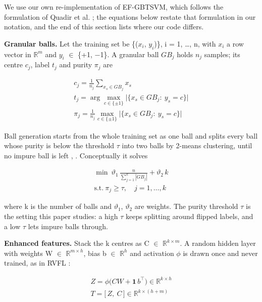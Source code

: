 \documentclass[conference,a4paper]{IEEEtran}
\begin{document}
We use our own re-implementation of EF-GBTSVM, which follows the formulation of Quadir et al. \cite{r29}; the equations below restate that formulation in our notation, and the end of this section lists where our code differs.

\textbf{Granular balls.} Let the training set be \{($x_i$, $y_i$)\}, i = 1, \ldots{}, n, with $x_i$ a row vector in $\mathbb{R}^{m}$ and $y_i$ $\in$ \{+1, $-$1\}. A granular ball $GB_j$ holds $n_j$ samples; its centre $c_j$, label $t_j$ and purity $\pi_j$ are

\begin{equation}
\begin{gathered}
c_j=\frac{1}{n_j}\sum_{x_s\in GB_j}x_s \\ t_j=\arg\max_{c\in\{\pm1\}}\bigl|\{x_s\in GB_j:\ y_s=c\}\bigr| \\ \pi_j=\frac{1}{n_j}\max_{c\in\{\pm1\}}\bigl|\{x_s\in GB_j:\ y_s=c\}\bigr|
\end{gathered}
\end{equation}

Ball generation starts from the whole training set as one ball and splits every ball whose purity is below the threshold $\tau$ into two balls by 2-means clustering, until no impure ball is left \cite{r30}, \cite{r29}. Conceptually it solves

\begin{equation}
\begin{gathered}
\min\ \vartheta_1\,\frac{n}{\sum_{j=1}^{k}|GB_j|}+\vartheta_2\,k \\ \text{s.t.}\ \pi_j\ge\tau,\quad j=1,\dots,k
\end{gathered}
\end{equation}

where k is the number of balls and $\vartheta_{1}$, $\vartheta_{2}$ are weights. The purity threshold $\tau$ is the setting this paper studies: a high $\tau$ keeps splitting around flipped labels, and a low $\tau$ lets impure balls through.

\textbf{Enhanced features.} Stack the k centres as C $\in$ $\mathbb{R}^{k\times m}$. A random hidden layer with weights W $\in$ $\mathbb{R}^{m\times h}$, bias b $\in$ $\mathbb{R}^{h}$ and activation $\phi$ is drawn once and never trained, as in RVFL \cite{r4}:

\begin{equation}
\begin{gathered}
Z=\phi\bigl(CW+\mathbf{1}\,b^{\top}\bigr)\in\mathbb{R}^{k\times h} \\ T=\bigl[\,Z,\ C\,\bigr]\in\mathbb{R}^{k\times(h+m)}
\end{gathered}
\end{equation}
\end{document}
